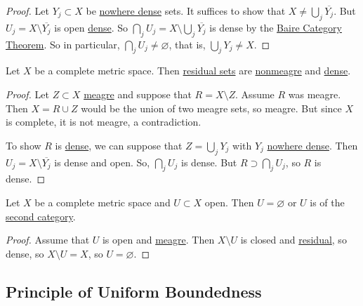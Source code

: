 \documentclass{article}
\renewcommand{\emptyset}{\varnothing}
\begin{document}
\begin{proof}
    Let $Y_j \subset X$ be \hyperlink{def:meagre}{nowhere dense} sets. It suffices to show that $X \neq \bigcup_j \overline{Y_j}$.
    But $U_j = X \setminus \overline{Y_j}$ is open \hyperlink{def:dense}{dense}.
    So $\bigcap_j U_j = X \setminus \bigcup_j \overline{Y_j}$ is dense by the \hyperlink{thm:baireCategory}{Baire Category Theorem}.
    So in particular, $\bigcap_j U_j \neq \emptyset$, that is, $\bigcup_j Y_j \neq X$.
\end{proof}

\begin{cor}
    Let $X$ be a complete metric space. Then \hyperlink{def:meagre}{residual sets} are \hyperlink{def:meagre}{nonmeagre} and \hyperlink{def:dense}{dense}.
\end{cor}

\begin{proof}
    Let $Z \subset X$ \hyperlink{def:meagre}{meagre} and suppose that $R = X \setminus Z$. Assume $R$ was meagre.
    Then $X = R \cup Z$ would be the union of two meagre sets, so meagre.
    But since $X$ is complete, it is not meagre, a contradiction.

    To show $R$ is \hyperlink{def:dense}{dense}, we can suppose that $Z = \bigcup_j Y_j$ with $Y_j$ \hyperlink{def:meagre}{nowhere dense}.
    Then $U_j = X \setminus \overline{Y_j}$ is dense and open.
    So, $\bigcap_j U_j$ is dense.
    But $R \supset \bigcap_j U_j$, so $R$ is dense.
\end{proof}


\begin{cor}
    Let $X$ be a complete metric space and $U \subset X$ open. Then $U = \emptyset$ or $U$ is of the \hyperlink{def:meagre}{second category}.
\end{cor}

\begin{proof}
    Assume that $U$ is open and \hyperlink{def:meagre}{meagre}.
    Then $X \setminus U$ is closed and \hyperlink{def:meagre}{residual}, so dense, so $X \setminus U = X$, so $U = \emptyset$.
\end{proof}

\subsection{Principle of Uniform Boundedness}
\end{document}
